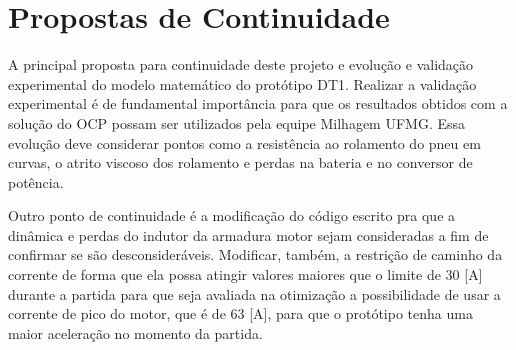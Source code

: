\section{Propostas de Continuidade}
\label{sec:5_2}

A principal proposta para continuidade deste projeto e evolução e validação experimental do modelo matemático do protótipo DT1.
Realizar a validação experimental é de fundamental importância para que os resultados obtidos com a solução do OCP possam ser utilizados pela equipe Milhagem UFMG.
Essa evolução deve considerar pontos como a resistência ao rolamento do pneu em curvas, o atrito viscoso dos rolamento e perdas na bateria e no conversor de potência.

Outro ponto de continuidade é a modificação do código escrito pra que a dinâmica e perdas do indutor da armadura motor sejam consideradas a fim de confirmar
se são desconsideráveis.  
Modificar, também, a restrição de caminho da corrente de forma que ela possa atingir valores maiores que o limite de $30$ [A] durante a partida para que 
seja avaliada na otimização a possibilidade de usar a corrente de pico do motor, que é de $63$ [A], para que o protótipo tenha
uma maior aceleração no momento da partida. 

\clearpage
